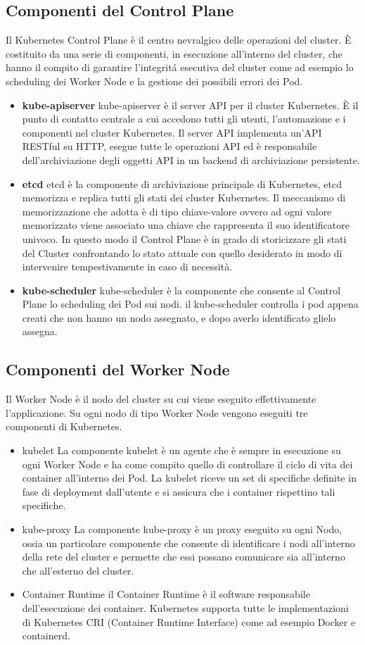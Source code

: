 \subsection{Componenti del Control Plane}
Il Kubernetes Control Plane è il centro nevralgico delle operazioni del cluster. È costituito da una serie di componenti, in esecuzione all'interno del cluster, che hanno il compito di garantire l'integritá esecutiva del cluster come ad esempio lo scheduling dei Worker Node e la gestione dei possibili errori dei Pod.
\begin{itemize}
    \item\textbf{kube-apiserver}
    kube-apiserver è il server API per il cluster Kubernetes. È il punto di contatto centrale a cui accedono tutti gli utenti, l'automazione e i componenti nel cluster Kubernetes. Il server API implementa un'API RESTful su HTTP, esegue tutte le operazioni API ed è responsabile dell'archiviazione degli oggetti API in un backend di archiviazione persistente.
    \item\textbf{etcd}
    etcd è la componente di archiviazione principale di Kubernetes, etcd memorizza e replica tutti gli stati dei cluster Kubernetes. Il meccanismo di memorizzazione che adotta è di tipo chiave-valore ovvero ad ogni valore memorizzato viene associato una chiave che rappresenta il suo identificatore univoco. In questo modo il Control Plane è in grado di storicizzare gli stati del Cluster confrontando lo stato attuale con quello desiderato in modo di intervenire tempestivamente in caso di necessità.
    \item\textbf{kube-scheduler}
    kube-scheduler è la componente che consente al Control Plane lo scheduling dei Pod sui nodi. il kube-scheduler controlla i pod appena creati che non hanno un nodo assegnato, e dopo averlo identificato glielo assegna. 
\end{itemize}
\subsection{Componenti del Worker Node}
Il Worker Node è il nodo del cluster su cui viene eseguito effettivamente l'applicazione. Su ogni nodo di tipo Worker Node vengono eseguiti tre componenti di Kubernetes.
\begin{itemize}
    \item{kubelet}
    La componente kubelet è un agente che è sempre in esecuzione su ogni Worker Node e ha come compito quello di controllare il ciclo di vita dei container all'interno dei Pod. La kubelet riceve un set di specifiche definite in fase di deployment dall'utente e si assicura che i container rispettino tali specifiche.
    \item{kube-proxy}
    La componente kube-proxy è un proxy eseguito su ogni Nodo, ossia un particolare componente che consente di identificare i nodi all'interno della rete del cluster e permette che essi possano comunicare sia all'interno che all'esterno del cluster.
    \item{Container Runtime} il Container Runtime è il software responsabile dell'esecuzione dei container. Kubernetes supporta tutte le implementazioni di Kubernetes CRI (Container Runtime Interface) come ad esempio Docker e containerd.
\end{itemize}

